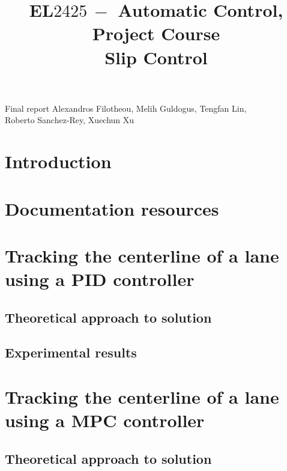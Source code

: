\documentclass[a4paper,12pt,oneside,onecolumn]{article} %
\title{
	\vspace{1in}
  EL$2425\ -$ Automatic Control, Project Course \\
  \vspace{0.2in}
  Slip Control
}
\begin{document}
	\maketitle

  \vfill

  \begin{center}

    \large Final report
    \vfill
    Alexandros Filotheou, Melih Guldogus, Tengfan Lin,\\ Roberto Sanchez-Rey, Xuechun Xu
  \end{center}

  \newpage
  \tableofcontents
  \newpage

\section{Introduction}

  

\section{Documentation resources}

  

  \newpage

  \section{Tracking the centerline of a lane using a PID controller}

    \subsection{Theoretical approach to solution}
      

    \subsection{Experimental results}
      

  \newpage

  \section{Tracking the centerline of a lane using a MPC controller}

    \subsection{Theoretical approach to solution}
      
\end{document}

